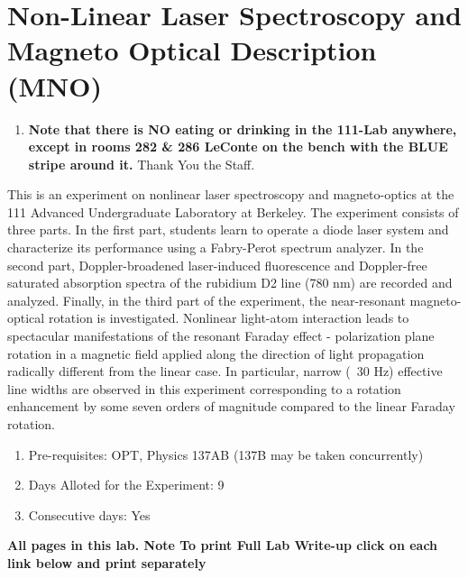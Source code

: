 \documentclass{../lab}
\begin{document}
\maketitle

\tableofcontents

\section{Non-Linear Laser Spectroscopy and Magneto Optical Description (MNO)}

\begin{enumerate}
    \item \textbf{Note that there is NO eating or drinking in the 111-Lab anywhere, except in rooms 282 \& 286 LeConte on the bench with the BLUE stripe around it.} Thank You the Staff.

\end{enumerate}

This is an experiment on nonlinear laser spectroscopy and magneto-optics at the 111 Advanced Undergraduate Laboratory at Berkeley. The experiment consists of three parts. In the first part, students learn to operate a diode laser system and characterize its performance using a Fabry-Perot spectrum analyzer. In the second part, Doppler-broadened laser-induced fluorescence and Doppler-free saturated absorption spectra of the rubidium D2 line (780 nm) are recorded and analyzed. Finally, in the third part of the experiment, the near-resonant magneto-optical rotation is investigated. Nonlinear light-atom interaction leads to spectacular manifestations of the resonant Faraday effect - polarization plane rotation in a magnetic field applied along the direction of light propagation radically different from the linear case. In particular, narrow (~30 Hz) effective line widths are observed in this experiment corresponding to a rotation enhancement by some seven orders of magnitude compared to the linear Faraday rotation.

\begin{enumerate}
    \item Pre-requisites: OPT, Physics 137AB (137B may be taken concurrently)

    \item Days Alloted for the Experiment: 9

    \item Consecutive days: Yes

\end{enumerate}

\textbf{All pages in this lab. Note To print Full Lab Write-up click on each link below and print separately }
\end{document}
